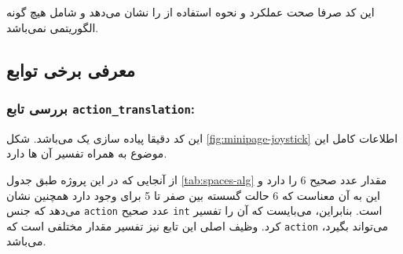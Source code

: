 \begin{note}
	این کد صرفا صحت عملکرد و نحوه استفاده از  را نشان می‌دهد و شامل هیچ گونه الگوریتمی نمی‌باشد.
\end{note}

\subsection{معرفی برخی توابع }



\begin{table}
\caption{تعریف  و   در پروژه}
\label{tab:spaces-alg}
\end{table}



\subsubsection{بررسی تابع \textbf{\texttt{action\_translation}:}}
این کد دقیقا پیاده سازی یک  می‌باشد. شکل \ref{fig:minipage-joystick} اطلاعات کامل این موضوع به همراه تفسیر آن ها دارد. 

از آنجایی که در این پروژه  طبق جدول \ref{tab:spaces-alg} مقدار عدد صحیح 6 را دارد و این به آن معناست که 6 حالت گسسته بین صفر تا 5 برای  وجود دارد همچنین نشان می‌دهد که جنس \texttt{action} عدد صحیح \texttt{int} است. بنابراین، می‌بایست که آن را تفسیر کرد. وظیف اصلی این تابع نیز تفسیر مقدار مختلفی است که \texttt{action} می‌تواند بگیرد، می‌باشد.
 





